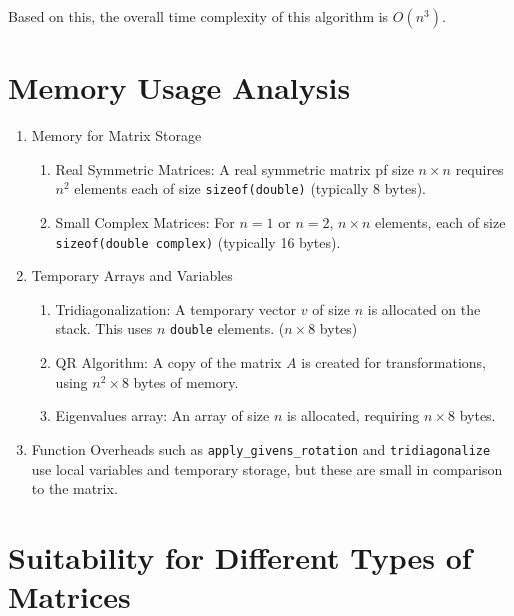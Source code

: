 \documentclass{article}
\theoremstyle{remark}
\begin{document}
    Based on this, the overall time complexity of this algorithm is $O(n^3)$.

\section{Memory Usage Analysis}

\begin{enumerate}
    \item Memory for Matrix Storage
        \begin{enumerate}
            \item Real Symmetric Matrices: A real symmetric matrix pf size $n \times n$ requires $n^2$ elements each of size \texttt{sizeof(double)} (typically 8 bytes).

            \item Small Complex Matrices: For $n=1$ or $n=2$, $n \times n$ elements, each of size \texttt{sizeof(double complex)} (typically 16 bytes).
        \end{enumerate}

    \item Temporary Arrays and Variables
        \begin{enumerate}
            \item Tridiagonalization: A temporary vector $v$ of size $n$ is allocated on the stack. This uses $n$ \texttt{double} elements. ($n \times 8$ bytes)

            \item QR Algorithm: A copy of the matrix $A$ is created for transformations, using $n^2 \times 8$ bytes of memory.

            \item Eigenvalues array: An array of size $n$ is allocated, requiring $n \times 8$ bytes.
        \end{enumerate}

    \item Function Overheads such as \texttt{apply\_givens\_rotation} and \texttt{tridiagonalize} use local variables and temporary storage, but these are small in comparison to the matrix.
    
\end{enumerate}



\section{Suitability for Different Types of Matrices}
\end{document}
